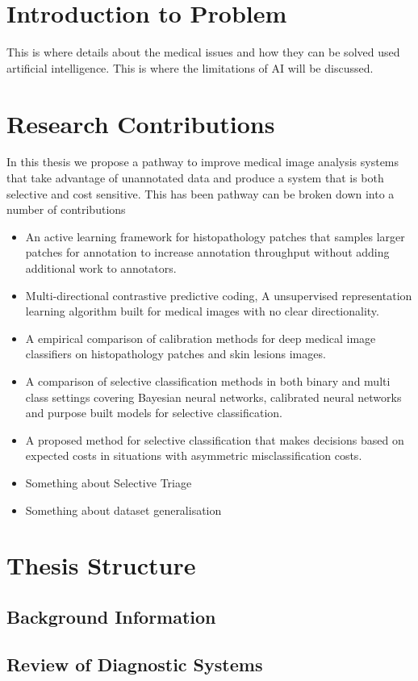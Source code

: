 \section{Introduction to Problem}
\label{sec:intoduction_to_problem}
This is where details about the medical issues and how they can be solved used artificial intelligence. This is where the limitations of AI will be discussed.


\section{Research Contributions}
\label{sec:research_contributions}

In this thesis we propose a pathway to improve medical image analysis systems that take advantage of unannotated data and produce a system that is both selective and cost sensitive. This has been pathway can be broken down into a number of contributions 

\begin{itemize}
	\item An active learning framework for histopathology patches that samples larger patches for annotation to increase annotation throughput without adding additional work to annotators.
	
	\item Multi-directional contrastive predictive coding, A unsupervised representation learning algorithm built for medical images with no clear directionality.

	\item A empirical comparison of calibration methods for deep medical image classifiers on histopathology patches and skin lesions images.
	
	\item A comparison of selective classification methods in both binary and multi class settings covering Bayesian neural networks, calibrated neural networks and purpose built models for selective classification.
	
	\item A proposed method for selective classification that makes decisions based on expected costs in situations with asymmetric misclassification costs.
	
	\item Something about Selective Triage
	
	\item Something about dataset generalisation
\end{itemize}


\section{Thesis Structure}
\label{sec:thesis_structure}

\subsection*{Background Information}

\subsection*{Review of Diagnostic Systems}
